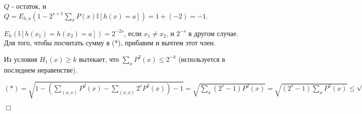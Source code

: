 \documentclass[12pt, a4paper]{article}
\begin{document}
$Q$ - остаток, и $Q = E_{h, a}(1 - 2^{s + 1} \sum\limits_x P(x) \mathbb{I}[h(x)=a]) = 1 + (-2) = -1$.

$E_h(\mathbb{I}[h(x_1) = h(x_2) = a]) = 2^{-2s}$, если $x_1 \neq x_2$, и $2^{-s}$ в другом случае. Для того, чтобы посчитать сумму в (*), прибавим и вычтем этот член.

Из условия $H_1(x)  \geq k$ вытекает, что $\sum\limits_x P^2(x) \leq 2^{-k}$ (используется в последнем неравенстве).

$(*) = \sqrt{1 - (\sum\limits_{(x, x)} P^2(x) - \sum\limits_{(x, x)} 2^{s} P^2(x) ) - 1} = 
\sqrt{\sum\limits_x (2^s - 1) P^2 (x)} =
\sqrt{(2^s - 1) \sum\limits_x P^2(x)} \leq
\sqrt{2^s 2^{-k}} =
2^{\frac{s - k}{2}}$

$\Box$
\end{document}
